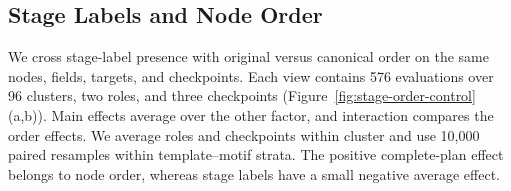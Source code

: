 \documentclass[sigconf,nonacm,balance=false]{aamas}
\begin{document}
\subsection{Stage Labels and Node Order}
\label{sec:supp-stage-order}
We cross stage-label presence with original versus canonical order on the same nodes, fields, targets, and checkpoints. Each view contains 576 evaluations over 96 clusters, two roles, and three checkpoints (Figure~\ref{fig:stage-order-control}(a,b)). Main effects average over the other factor, and interaction compares the order effects. We average roles and checkpoints within cluster and use 10,000 paired resamples within template--motif strata. The positive complete-plan effect belongs to node order, whereas stage labels have a small negative average effect.

\FloatBarrier
\end{document}
